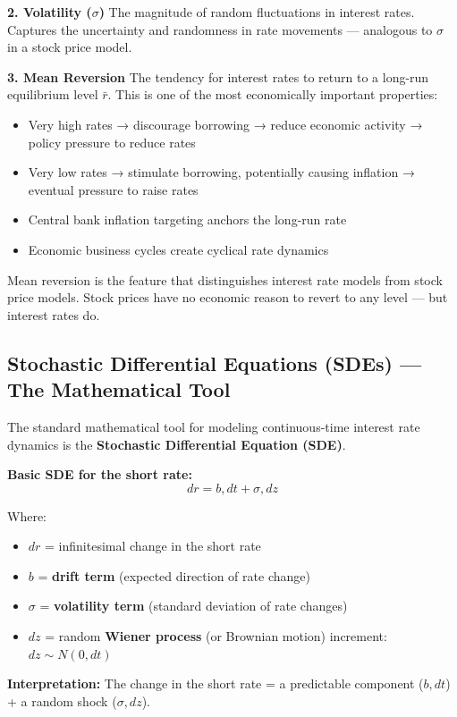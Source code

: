 \documentclass[12pt,openany]{book}
\theoremstyle{definition}
\theoremstyle{remark}
\begin{document}
\textbf{2. Volatility (\(\sigma\))} The magnitude of random fluctuations in interest rates. Captures the uncertainty and randomness in rate movements --- analogous to \(\sigma\) in a stock price model.

\textbf{3. Mean Reversion} The tendency for interest rates to return to a long-run equilibrium level $\bar{r}$. This is one of the most economically important properties:

\begin{itemize}
\item Very high rates → discourage borrowing → reduce economic activity → policy pressure to reduce rates


\item Very low rates → stimulate borrowing, potentially causing inflation → eventual pressure to raise rates


\item Central bank inflation targeting anchors the long-run rate


\item Economic business cycles create cyclical rate dynamics


\end{itemize}
Mean reversion is the feature that distinguishes interest rate models from stock price models. Stock prices have no economic reason to revert to any level --- but interest rates do.

\medskip
\subsection{Stochastic Differential Equations (SDEs) --- The Mathematical Tool}
The standard mathematical tool for modeling continuous-time interest rate dynamics is the \textbf{Stochastic Differential Equation (SDE)}.

\textbf{Basic SDE for the short rate:} \[
dr = b , dt + \sigma , dz
\]

Where:

\begin{itemize}
\item $dr$ = infinitesimal change in the short rate


\item $b$ = \textbf{drift term} (expected direction of rate change)


\item $\sigma$ = \textbf{volatility term} (standard deviation of rate changes)


\item $dz$ = random \textbf{Wiener process} (or Brownian motion) increment: $dz \sim N(0, dt)$


\end{itemize}
\textbf{Interpretation:} The change in the short rate = a predictable component ($b , dt$) + a random shock ($\sigma , dz$).
\end{document}

